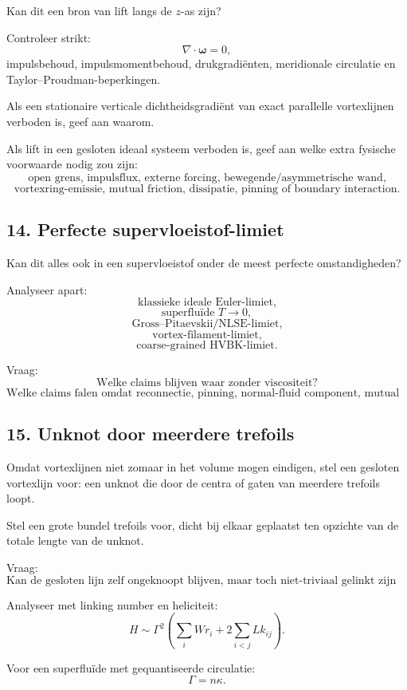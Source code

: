 \documentclass[11pt,a4paper]{article}
\begin{document}
Kan dit een bron van lift langs de \(z\)-as zijn?

Controleer strikt:
\[
\nabla\cdot\boldsymbol{\omega}=0,
\]
impulsbehoud, impulsmomentbehoud, drukgradiënten, meridionale circulatie en Taylor--Proudman-beperkingen.

Als een stationaire verticale dichtheidsgradiënt van exact parallelle vortexlijnen verboden is, geef aan waarom.

Als lift in een gesloten ideaal systeem verboden is, geef aan welke extra fysische voorwaarde nodig zou zijn:
\[
\text{open grens, impulsflux, externe forcing, bewegende/asymmetrische wand,}
\]
\[
\text{vortexring-emissie, mutual friction, dissipatie, pinning of boundary interaction.}
\]

\subsection{14. Perfecte supervloeistof-limiet}

Kan dit alles ook in een supervloeistof onder de meest perfecte omstandigheden?

Analyseer apart:
\[
\text{klassieke ideale Euler-limiet,}
\]
\[
\text{superfluïde }T\rightarrow0,
\]
\[
\text{Gross--Pitaevskii/NLSE-limiet,}
\]
\[
\text{vortex-filament-limiet,}
\]
\[
\text{coarse-grained HVBK-limiet.}
\]

Vraag:
\[
\text{Welke claims blijven waar zonder viscositeit?}
\]
\[
\text{Welke claims falen omdat reconnectie, pinning, normal-fluid component, mutual friction, boundary forcing of quantisatie nodig is?}
\]

\subsection{15. Unknot door meerdere trefoils}

Omdat vortexlijnen niet zomaar in het volume mogen eindigen, stel een gesloten vortexlijn voor: een unknot die door de centra of gaten van meerdere trefoils loopt.

Stel een grote bundel trefoils voor, dicht bij elkaar geplaatst ten opzichte van de totale lengte van de unknot.

Vraag:
\[
\text{Kan de gesloten lijn zelf ongeknoopt blijven, maar toch niet-triviaal gelinkt zijn met veel trefoils?}
\]

Analyseer met linking number en heliciteit:
\[
H
\sim
\Gamma^2
\left(
\sum_i Wr_i
+
2\sum_{i<j}Lk_{ij}
\right).
\]

Voor een superfluïde met gequantiseerde circulatie:
\[
\Gamma=n\kappa.
\]
\end{document}
